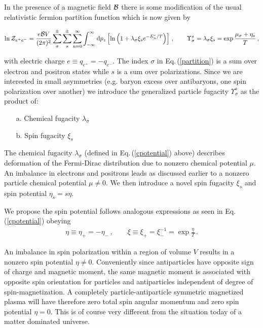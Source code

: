 \documentclass[reprint]{revtex4-2}
\newcommand{\req}[1]{Eq.\,(\ref{#1})}
\newcommand*{\xblue}{\color{black}}
\begin{document}
In the presence of a magnetic field ${\cal B}$ there is some modification of the usual relativistic fermion partition function which is now given  by
\begin{widetext}
\begin{align}
    \label{partition}
    \ln{\cal Z}_{e^{+}e^{-}}=\frac{e{\cal B}V}{(2\pi)^{2}}\sum_{\sigma}^{\pm}\sum_{s}^{\pm}\sum_{n=0}^{\infty}\int_{-\infty}^{\infty}{\rm d}p_{z}\left[\ln\left(1+\lambda_{\sigma}\xi_{s}e^{-E_{n}^{s}/T}\right)\right]\,,\qquad\Upsilon_{\sigma}^{s}=\lambda_{\sigma}\xi_{s}=\exp{\frac{\mu_{\sigma}+\eta_{s}}{T}}\,,
\end{align}
\end{widetext}
{\xblue with electric charge $e\equiv q_{e^{+}}=-q_{e^{-}}$.} The index $\sigma$ in \req{partition} is a sum over electron and positron states while $s$ is a sum over polarizations. Since we are interested in small asymmetries (e.g. baryon excess over antibaryons, one spin polarization over another) we introduce the generalized particle fugacity $\Upsilon_{\sigma}^{s}$ as the product of:
\begin{itemize}
    \item[a.] Chemical fugacity $\lambda_{\sigma}$
    \item[b.] Spin fugacity $\xi_{s}$
\end{itemize}
The chemical fugacity $\lambda_{\sigma}$ {\xblue (defined in \req{cpotential} above) describes deformation of the Fermi-Dirac distribution due to nonzero chemical potential $\mu$.} An imbalance in electrons and positrons leads {\xblue as discussed earlier} to a nonzero particle chemical potential $\mu\neq0$. We then introduce a novel spin fugacity $\xi_{s}$ and spin potential $\eta_{s}=s\eta$. {\xblue We propose the spin potential follows analogous expressions as seen in \req{cpotential} obeying
\begin{align}
    \label{spotential}
    \eta\equiv\eta_{+}=-\eta_{-}\,,\qquad
    \xi\equiv\xi_{+}=\xi_{-}^{-1}= \exp{\frac{\eta}{T}}\,.
\end{align}

An imbalance in spin polarization within a region of volume $V$ results in a nonzero spin potential $\eta\neq0$. Conveniently since antiparticles have opposite sign of charge and magnetic moment, the same magnetic moment is associated with opposite spin orientation for particles and antiparticles independent of degree of spin-magnetization. A completely particle-antiparticle symmetric magnetized plasma will have therefore zero total spin angular momentum and zero spin potential $\eta=0$. This is of course very different from the situation today of a matter dominated universe.}
\end{document}
